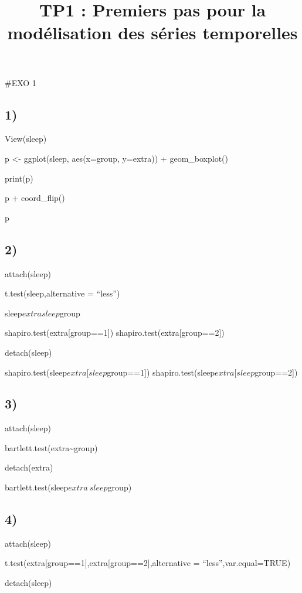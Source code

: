 \documentclass[
]{article}
\title{TP1 : Premiers pas pour la modélisation des séries temporelles}
\author{}
\date{\vspace{-2.5em}}
\begin{document}
\maketitle

\#EXO 1

\hypertarget{section}{%
\subsection{1)}\label{section}}

View(sleep)

p \textless- ggplot(sleep, aes(x=group, y=extra)) + geom\_boxplot()

print(p)

p + coord\_flip()

p

\hypertarget{section-1}{%
\subsection{2)}\label{section-1}}

attach(sleep)

t.test(sleep,alternative = ``less'')

sleep\(extra sleep\)group

shapiro.test(extra{[}group==1{]}) shapiro.test(extra{[}group==2{]})

detach(sleep)

shapiro.test(sleep\(extra[sleep\)group==1{]})
shapiro.test(sleep\(extra[sleep\)group==2{]})

\hypertarget{section-2}{%
\subsection{3)}\label{section-2}}

attach(sleep)

bartlett.test(extra\textasciitilde group)

detach(extra)

bartlett.test(sleep\(extra~sleep\)group)

\hypertarget{section-3}{%
\subsection{4)}\label{section-3}}

attach(sleep)

t.test(extra{[}group==1{]},extra{[}group==2{]},alternative =
``less'',var.equal=TRUE)

detach(sleep)
\end{document}
